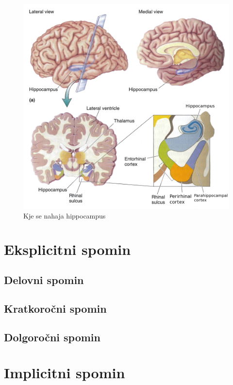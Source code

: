 \documentclass[10pt,a4paper]{article}
\begin{document}
\begin{figure}[h]
  \centering
    \includegraphics[width=1.0\textwidth]{LokacijaHippocampusa.png}
  \caption{Kje se nahaja hippocampus}
  \label{sHippocampus}
\end{figure}



\section{Eksplicitni spomin}
\subsection{Delovni spomin}

\subsection{Kratkoročni spomin}

\subsection{Dolgoročni spomin}

\section{Implicitni spomin}
\end{document}
